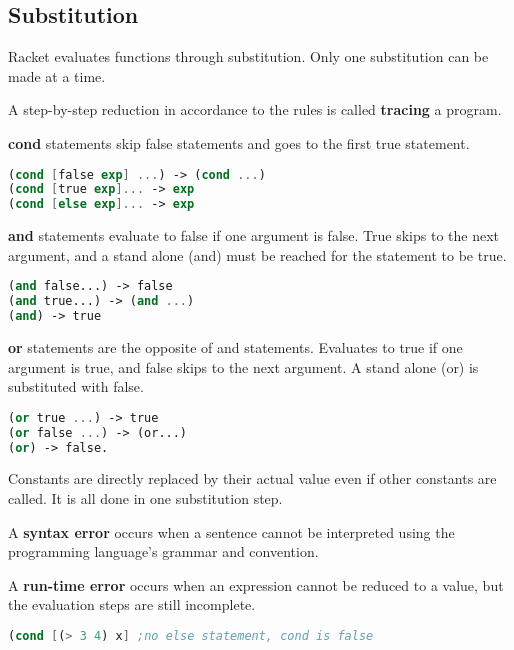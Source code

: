 \documentclass[english, 12pt]{article}
\begin{document}
\subsection{Substitution}
Racket evaluates functions through substitution. Only one substitution can be made at a time. 
\begin{defn}
A step-by-step reduction in accordance to the rules is called \textbf{tracing} a program.
\end{defn}
\begin{exmp}
\textbf{cond} statements skip false statements and goes to the first true statement.
\begin{lstlisting}[language=Scheme]
(cond [false exp] ...) -> (cond ...)
(cond [true exp]... -> exp
(cond [else exp]... -> exp
\end{lstlisting}
\end{exmp}
\begin{exmp}
\textbf{and} statements evaluate to false if one argument is false. True skips to the next argument, and a stand alone (and) must be reached for the statement to be true.
\begin{lstlisting}[language=Scheme]
(and false...) -> false
(and true...) -> (and ...)
(and) -> true
\end{lstlisting}
\end{exmp}
\begin{exmp}
\textbf{or} statements are the opposite of and statements. Evaluates to true if one argument is true, and false skips to the next argument. A stand alone (or) is substituted with false.
\begin{lstlisting}[language=Scheme]
(or true ...) -> true
(or false ...) -> (or...)
(or) -> false.
\end{lstlisting}
\end{exmp}
Constants are directly replaced by their actual value even if other constants are called. It is all done in one substitution step.
\begin{defn}
A \textbf{syntax error} occurs when a sentence cannot be interpreted using the programming language's grammar and convention.
\end{defn}
\begin{defn}
A \textbf{run-time error} occurs when an expression cannot be reduced to a value, but the evaluation steps are still incomplete.
\begin{lstlisting}[language=Scheme]
(cond [(> 3 4) x] ;no else statement, cond is false
\end{lstlisting}
\end{defn}
\newpage
\end{document}

